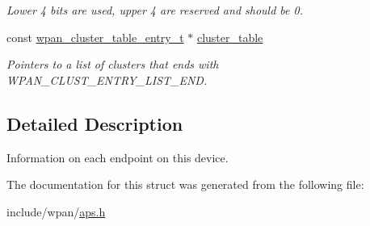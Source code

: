\begin{DoxyCompactItemize}
\begin{DoxyCompactList}\small\item\em Lower 4 bits are used, upper 4 are reserved and should be 0. \end{DoxyCompactList}\item 
const \hyperlink{structwpan__cluster__table__entry__t}{wpan\+\_\+cluster\+\_\+table\+\_\+entry\+\_\+t} $\ast$ \hyperlink{group__wpan__aps_gac7944498524739a9becec626bf9bcb15}{cluster\+\_\+table}
\begin{DoxyCompactList}\small\item\em Pointers to a list of clusters that ends with W\+P\+A\+N\+\_\+\+C\+L\+U\+S\+T\+\_\+\+E\+N\+T\+R\+Y\+\_\+\+L\+I\+S\+T\+\_\+\+E\+ND. \end{DoxyCompactList}\end{DoxyCompactItemize}


\subsection{Detailed Description}
Information on each endpoint on this device. 

The documentation for this struct was generated from the following file\+:\begin{DoxyCompactItemize}
\item 
include/wpan/\hyperlink{aps_8h}{aps.\+h}\end{DoxyCompactItemize}
